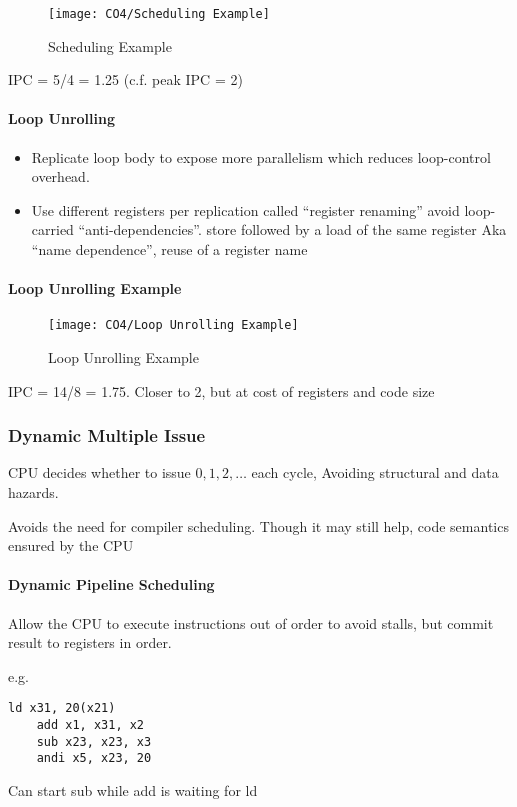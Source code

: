 \begin{figure}[!htb]
    \centering
    \texttt{[image: CO4/Scheduling Example]}
    \caption{Scheduling Example}
\end{figure}
IPC = 5/4 = 1.25 (c.f. peak IPC = 2)

\paragraph{Loop Unrolling}
\begin{itemize}\small
    \item Replicate loop body to expose more parallelism
    \subitem which reduces loop-control overhead.
    \item Use different registers per replication
    \subitem called ``register renaming''
    \subitem avoid loop-carried ``anti-dependencies''. 
    \subsubitem store followed by a load of the same register
    \subsubitem Aka ``name dependence'', reuse of a register name
\end{itemize}

\paragraph{Loop Unrolling Example}
\begin{figure}[!htb]
    \centering
    \texttt{[image: CO4/Loop Unrolling Example]}
    \caption{Loop Unrolling Example}
\end{figure}
IPC = 14/8 = 1.75. Closer to 2, but at cost of registers and code size

\subsubsection{Dynamic Multiple Issue}
CPU decides whether to issue $0, 1, 2, \dots$ each cycle, Avoiding structural and data hazards. 

Avoids the need for compiler scheduling. Though it may still help, code semantics ensured by the CPU


\paragraph{Dynamic Pipeline Scheduling}
Allow the CPU to execute instructions out of
order to avoid stalls, but commit result to registers in order. 

e.g. 
\begin{lstlisting}[language={[x86masm]Assembler}]
    ld x31, 20(x21)
    add x1, x31, x2
    sub x23, x23, x3
    andi x5, x23, 20
\end{lstlisting}
Can start sub while add is waiting for ld


